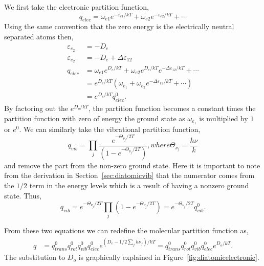 We first take the electronic partition function,
\begin{equation*}
	q_{elec} = \omega_{e1} e^{-\varepsilon_{e1}/kT} + \omega_{e2}
	e^{-\varepsilon_{e2}/kT} + \cdots
\end{equation*}
Using the same convention that the zero energy is the electrically neutral
separated atoms then,
\begin{align*}
	\varepsilon_{e_2} &= -D_e \\
	\varepsilon_{e_2} &= -D_e + \Delta\varepsilon_{12} \\
	q_{elec} &= \omega_{e1} e^{D_e/kT} + \omega_{e2}
	e^{D_e/kT}e^{-\Delta\varepsilon_{12}/kT} + \cdots \\
			 &= e^{D_{e}/kT} (\omega_{e_{1}} + \omega_{e_2}
			 e^{-\Delta\varepsilon_{12}/kT} + \cdots) \\
			 &= e^{D_e/kT} q_{elec}^0.
\end{align*}
By factoring out the $e^{D_{o}/kT}$, the partition function becomes a constant
times the partition function with zero of energy the ground state as
$\omega_{e_{1}}$ is multiplied by $1$ or $e^0$. We can similarly take the
vibrational partition function,
\begin{equation*}
	q_{vib} = \prod_{j}{\frac{e^{-\Theta_{\nu_{j}}/2T}}
	{(1 - e^{-\Theta_{\nu_{j}}/2T})}}, where \Theta_{\nu_j} = \frac{h\nu}{k}
\end{equation*}
and remove the part from the non-zero ground state. Here it is important to note
from the derivation in Section~\ref{sec:diatomicvib} that the numerator comes
from the $1 /2$ term in the energy levels which is a result of having a nonzero
ground state. Thus,
\begin{equation*}
	q_{vib} = e^{-\Theta_{\nu_{j}}/2T}\prod_{j}{(1 - e^{-\Theta_{\nu_{j}}/2T})}
	= e^{-\Theta_{\nu_{j}}/2T} q_{vib}^0.
\end{equation*}

From these two equations we can redefine the molecular partition function as,
\begin{align*}
	q &= q_{trans}^0 q_{rot}^0 q_{vib}^0 q_{elec}^0 e^{(D_e - 1/2
		\sum_{j}{h\nu_{j}})/kT} = q_{trans}^0 q_{rot}^0 q_{vib}^0 q_{elec}^0
		e^{D_o /kT}.
\end{align*}
The substitution to $D_o$ is graphically explained in
Figure~\ref{fig:diatomicelectronic}.
